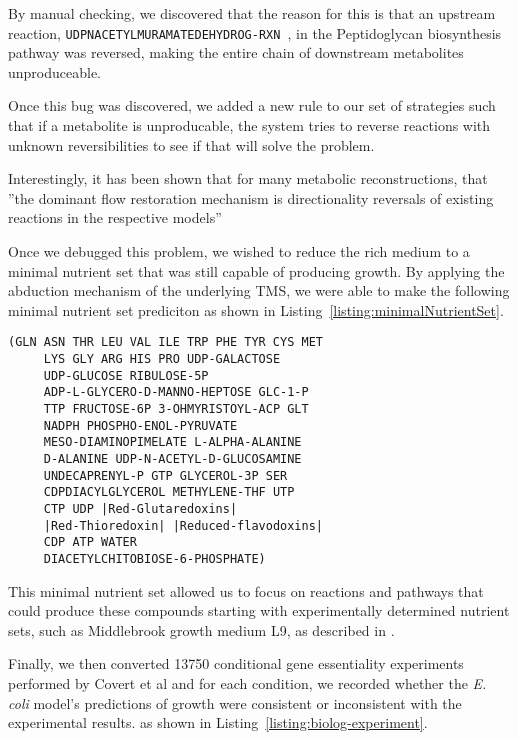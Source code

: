By manual checking, we discovered that the reason for this is that an upstream reaction, {\tt UDPNACETYLMURAMATEDEHYDROG-RXN }, in the Peptidoglycan biosynthesis pathway was reversed, making the entire chain of downstream metabolites unproduceable. 

Once this bug was discovered,  we added a new rule to our set of strategies such that
 if a metabolite is unproducable, the system tries to reverse
reactions with unknown reversibilities to see if that will
solve the problem.  

Interestingly, it has been shown that for many metabolic reconstructions,
that ''the dominant flow restoration mechanism is directionality
reversals of existing reactions in the respective
models''\cite{kumar2007}

Once we debugged this problem, we wished to reduce the rich medium to a minimal nutrient set that was still
capable of producing growth. By applying the abduction mechanism of the underlying TMS, we were able to make the following
minimal nutrient set prediciton as shown in Listing~\ref{listing:minimalNutrientSet}.
\begin{lstlisting}[label={listing:minimalNutrientSet},caption={{\em E. coli} predicted minimal nutrient set}]
(GLN ASN THR LEU VAL ILE TRP PHE TYR CYS MET 
     LYS GLY ARG HIS PRO UDP-GALACTOSE 
     UDP-GLUCOSE RIBULOSE-5P 
     ADP-L-GLYCERO-D-MANNO-HEPTOSE GLC-1-P 
     TTP FRUCTOSE-6P 3-OHMYRISTOYL-ACP GLT 
     NADPH PHOSPHO-ENOL-PYRUVATE 
     MESO-DIAMINOPIMELATE L-ALPHA-ALANINE 
     D-ALANINE UDP-N-ACETYL-D-GLUCOSAMINE 
     UNDECAPRENYL-P GTP GLYCEROL-3P SER
     CDPDIACYLGLYCEROL METHYLENE-THF UTP 
     CTP UDP |Red-Glutaredoxins|
     |Red-Thioredoxin| |Reduced-flavodoxins| 
     CDP ATP WATER
     DIACETYLCHITOBIOSE-6-PHOSPHATE)
\end{lstlisting}
This minimal nutrient set allowed us to focus on reactions and pathways that could produce these compounds starting
with experimentally determined nutrient sets, such as Middlebrook growth medium L9, as described in \cite{joyce2006}.


Finally, we then converted 13750 conditional gene essentiality experiments performed by
Covert et al\cite{covert2004} and for each condition, we recorded
whether the {\em E. coli} model's predictions of growth were
consistent or inconsistent with the experimental results. as shown in Listing~\ref{listing:biolog-experiment}.

